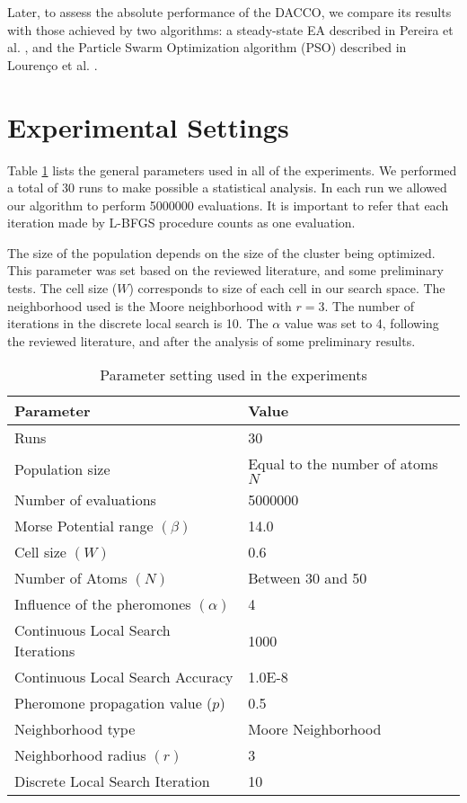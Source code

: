 	Later, to assess the absolute performance of the DACCO, we compare its results with those achieved by two algorithms: a steady-state EA described in Pereira et al. \cite{xico09}, and the Particle Swarm Optimization algorithm (PSO) described in Lourenço et al. \cite{lourenco11}.
	
\section*{Experimental Settings}
\label{sec:experimental_setting}

Table \ref{tab:general_settings} lists the general parameters used in all of the experiments. We performed a total of 30 runs to make possible a statistical analysis. In each run we allowed our algorithm to perform 5000000 evaluations. It is important to refer that each iteration made by L-BFGS procedure counts as one evaluation. 

The size of the population depends on the size of the cluster being optimized. This parameter was set based on the reviewed literature, and some preliminary tests. The cell size ($W$) corresponds to size of each cell in our search space. The neighborhood used is the Moore neighborhood with $r = 3$. The number of iterations in the discrete local search is 10. The $\alpha$ value was set to 4, following the reviewed literature, and after the analysis of some preliminary results.

\begin{table}[!htbp]
	\begin{center}
		\begin{tabular}{| l | p{8cm} |}
			\hline
			\textbf{Parameter} & \textbf{Value} \\ \hline
			Runs & 30 \\
			Population size & Equal to the number of atoms $N$\\
			Number of evaluations & 5000000 \\
			Morse Potential range $(\beta)$ & 14.0 \\ 
			Cell size $(W)$ & 0.6 \\
			Number of Atoms $(N)$ & Between 30 and 50 \\
			Influence of the pheromones $(\alpha)$ & 4 \\
			Continuous Local Search Iterations & 1000\\
			Continuous Local Search Accuracy & 1.0E-8\\
			Pheromone propagation value ($p$) & 0.5 \\
			Neighborhood type & Moore Neighborhood \\
			Neighborhood radius $(r)$ & 3 \\
			Discrete Local Search Iteration & 10 \\
			\hline
		\end{tabular}
	\caption{Parameter setting used in the experiments}
	\label{tab:general_settings}
	\end{center}
\end{table}
\pagebreak

